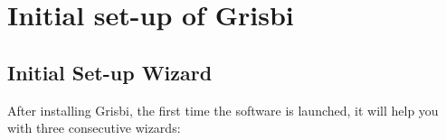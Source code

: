 

\chapter{Initial set-up of Grisbi\label{start}}


\section{Initial Set-up Wizard\label{start-first}}


After installing Grisbi, the first time the software is launched, it will help you with three consecutive wizards:

